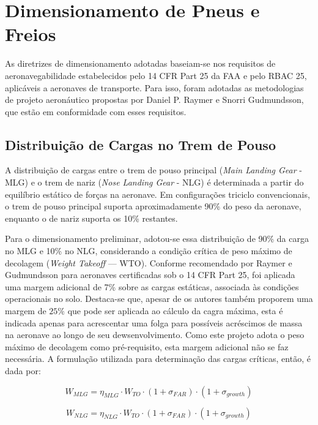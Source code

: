 \section{Dimensionamento de Pneus e Freios}
As diretrizes de dimensionamento adotadas baseiam-se nos requisitos de aeronavegabilidade estabelecidos pelo 14 CFR Part 25 da FAA e pelo RBAC 25, aplicáveis a aeronaves de transporte. Para isso, foram adotadas as metodologias de projeto aeronáutico propostas por Daniel P. Raymer e Snorri Gudmundsson, que estão em conformidade com esses requisitos.

\subsection{Distribuição de Cargas no Trem de Pouso}
\label{sec:distribuicao_cargas_tdp}

A distribuição de cargas entre o trem de pouso principal (\textit{Main Landing Gear} - MLG) e o trem de nariz (\textit{Nose Landing Gear} - NLG) é determinada a partir do equilíbrio estático de forças na aeronave. Em configurações triciclo convencionais, o trem de pouso principal suporta aproximadamente 90\% do peso da aeronave, enquanto o de nariz suporta os 10\% restantes.

Para o dimensionamento preliminar, adotou-se essa distribuição de 90\% da carga no MLG e 10\% no NLG, considerando a condição crítica de peso máximo de decolagem (\textit{Weight Takeoff} --- WTO). Conforme recomendado por Raymer e Gudmundsson para aeronaves certificadas sob o 14 CFR Part 25, foi aplicada uma margem adicional de 7\% sobre as cargas estáticas, associada às condições operacionais no solo.  Destaca-se que, apesar de os autores também proporem uma margem de $25 \%$ que pode ser aplicada ao cálculo da cagra máxima, esta é indicada apenas para acrescentar uma folga para possíveis acréscimos de massa na aeronave ao longo de seu dewsenvolvimento. Como este projeto adota o peso máximo de decolagem como pré-requisito, esta margem adicional não se faz necessária. A formulação utilizada para determinação das cargas críticas, então, é dada por:

\begin{equation}
W_{MLG} = \eta_{MLG} \cdot W_{TO} \cdot (1 + \sigma_{FAR}) \cdot (1 + \sigma_{growth})
\end{equation}

\begin{equation}
W_{NLG} = \eta_{NLG} \cdot W_{TO} \cdot (1 + \sigma_{FAR}) \cdot (1 + \sigma_{growth})
\end{equation}

